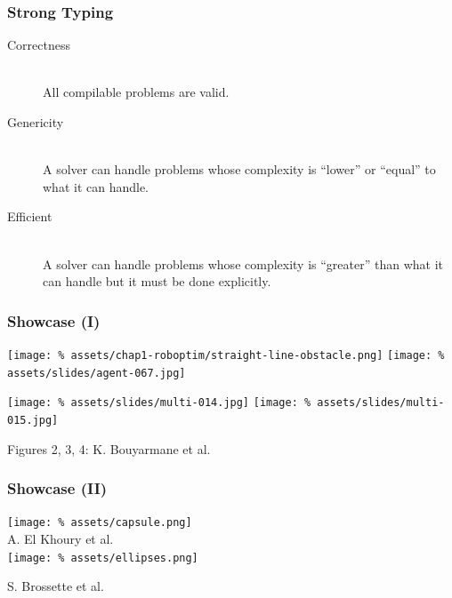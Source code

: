 \begin{frame}
  \frametitle{Strong Typing}

    \begin{center}
      \begin{description}
        \item[Correctness]~\\
          All compilable problems are valid.

        \item[Genericity]~\\
          A solver can handle problems whose complexity is ``lower''
          or ``equal'' to what it can handle.
          
        \item[Efficient]~\\
          A solver can handle problems whose complexity is ``greater''
          than what it can handle but it must be done explicitly.
      \end{description}
    \end{center}
  
\end{frame}


\begin{frame}
  \frametitle{Showcase (I)}

  \begin{center}
    \texttt{[image: \%
      assets/chap1-roboptim/straight-line-obstacle.png]}
    \texttt{[image: \%
      assets/slides/agent-067.jpg]}\par
    \texttt{[image: \%
      assets/slides/multi-014.jpg]}
    \texttt{[image: \%
      assets/slides/multi-015.jpg]}

    Figures 2, 3, 4: K. Bouyarmane et al.
  \end{center}
\end{frame}

\begin{frame}
  \frametitle{Showcase (II)}

  \begin{center}
    \texttt{[image: \%
      assets/capsule.png]}\\
    A. El Khoury et al.\\
    \bigskip
    \texttt{[image: \%
      assets/ellipses.png]}\par
    S. Brossette et al.
  \end{center}
\end{frame}


